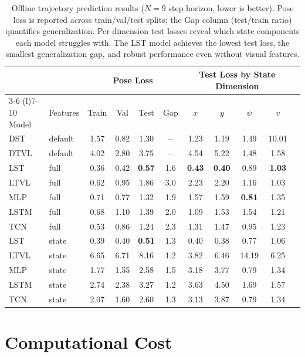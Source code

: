 \begin{table}[t]
\centering
\caption{Offline trajectory prediction results ($N = 9$ step horizon, lower is better). Pose loss is reported across train/val/test splits; the Gap column (test/train ratio) quantifies generalization. Per-dimension test losses reveal which state components each model struggles with. The LST model achieves the lowest test loss, the smallest generalization gap, and robust performance even without visual features.}
\label{tab:offline-results}
\small
\begin{tabular}{@{}llccccccccc@{}}
\toprule
 & & \multicolumn{4}{c}{Pose Loss} & \multicolumn{4}{c}{Test Loss by State Dimension} \\
\cmidrule(lr){3-6} \cmidrule(l){7-10}
Model & Features & Train & Val & Test & Gap & $x$ & $y$ & $\psi$ & $v$ \\
\midrule
DST & default & 1.57 & 0.82 & 1.30 & -- & 1.23 & 1.19 & 1.49 & 10.01 \\
DTVL & default & 4.02 & 2.80 & 3.75 & -- & 4.54 & 5.22 & 1.48 & 1.58 \\
\midrule
LST & full & 0.36 & 0.42 & \textbf{0.57} & 1.6 & \textbf{0.43} & \textbf{0.40} & 0.89 & \textbf{1.03} \\
LTVL & full & 0.62 & 0.95 & 1.86 & 3.0 & 2.23 & 2.20 & 1.16 & 1.03 \\
MLP & full & 0.71 & 0.77 & 1.32 & 1.9 & 1.57 & 1.59 & \textbf{0.81} & 1.35 \\
LSTM & full & 0.68 & 1.10 & 1.39 & 2.0 & 1.09 & 1.53 & 1.54 & 1.21 \\
TCN & full & 0.53 & 0.86 & 1.24 & 2.3 & 1.31 & 1.47 & 0.95 & 1.23 \\
\midrule
LST & state & 0.39 & 0.40 & \textbf{0.51} & 1.3 & 0.40 & 0.38 & 0.77 & 1.06 \\
LTVL & state & 6.65 & 6.71 & 8.16 & 1.2 & 3.82 & 6.46 & 14.19 & 6.25 \\
MLP & state & 1.77 & 1.55 & 2.58 & 1.5 & 3.18 & 3.77 & 0.79 & 1.34 \\
LSTM & state & 2.74 & 2.38 & 3.27 & 1.2 & 3.63 & 4.50 & 1.69 & 1.57 \\
TCN & state & 2.07 & 1.60 & 2.60 & 1.3 & 3.13 & 3.87 & 0.79 & 1.34 \\
\bottomrule
\end{tabular}
\end{table}

\section{Computational Cost}
\label{sec:compute}

